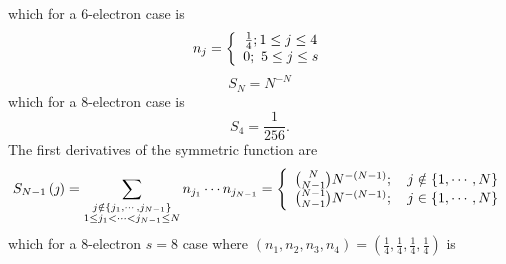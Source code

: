 \documentclass[aps,preprint]{revtex4}%
\begin{document}
which for a $6$-electron case is%
\begin{equation}
n_{j}=\left\{
\begin{array}
[c]{c}%
\frac{1}{4};1\leq j\leq4\\
0;\text{ }5\leq j\leq s
\end{array}
\right.
\end{equation}%
\begin{equation}
S_{N}=N^{-N}%
\end{equation}
which for a $8$-electron case is%
\begin{equation}
S_{4}=\frac{1}{256}.
\end{equation}
The first derivatives of the symmetric function are
\begin{equation}
S_{N-1}\left(  \jmath\right)  =\sum_{\substack{j\notin\left\{  j_{1}%
,\cdots,j_{N-1}\right\}  \\1\leq j_{1}<\cdots<j_{N-1}\leq N}}n_{j_{1}}\cdots
n_{j_{N-1}}=\left\{
\begin{array}
[c]{c}%
\binom{N}{N-1}N^{-\left(  N-1\right)  };\quad j\notin\left\{  1,\cdots
,N\right\} \\
\binom{N-1}{N-1}N^{-\left(  N-1\right)  };\quad j\in\left\{  1,\cdots
,N\right\}
\end{array}
\right.
\end{equation}
which for a $8$-electron $s=8$ case where $\left(  n_{1},n_{2},n_{3}%
,n_{4}\right)  =\left(  \frac{1}{4},\frac{1}{4},\frac{1}{4},\frac{1}%
{4}\right)  $ is%
\end{document}
